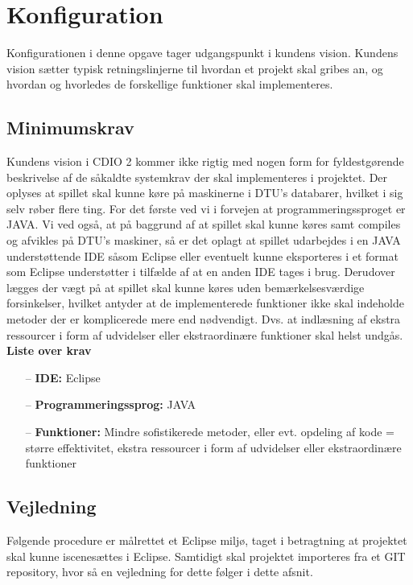 \chapter{Konfiguration}

Konfigurationen i denne opgave tager udgangspunkt i kundens vision. Kundens vision sætter typisk retningslinjerne til hvordan et projekt skal gribes an, og hvordan og hvorledes de forskellige funktioner skal implementeres.

\section{Minimumskrav}

Kundens vision i CDIO 2 kommer ikke rigtig med nogen form for fyldestgørende beskrivelse af de såkaldte systemkrav der skal implementeres i projektet. 
Der oplyses at spillet skal kunne køre på maskinerne i DTU’s databarer, hvilket i sig selv røber flere ting.
For det første ved vi i forvejen at programmeringssproget er JAVA. 
Vi ved også, at på baggrund af at spillet skal kunne køres samt compiles og afvikles på DTU's maskiner, så er det oplagt at spillet udarbejdes i en JAVA understøttende IDE såsom Eclipse eller eventuelt kunne eksporteres i et format som Eclipse understøtter i tilfælde af at en anden IDE tages i brug. 
Derudover lægges der vægt på at spillet skal kunne køres uden bemærkelsesværdige forsinkelser, hvilket antyder at de implementerede funktioner ikke skal indeholde metoder der er komplicerede mere end nødvendigt. 
Dvs. at indlæsning af ekstra ressourcer i form af udvidelser eller ekstraordinære funktioner skal helst undgås.
\\

\noindent \textbf{Liste over krav}
\begin{itemize}
    \item[--] \textbf{IDE:} Eclipse
    \item[--] \textbf{Programmeringssprog:} JAVA
    \item[--] \textbf{Funktioner:} Mindre sofistikerede metoder, eller evt. opdeling af kode = større effektivitet, ekstra ressourcer i form af udvidelser eller ekstraordinære funktioner
\end{itemize}

\section{Vejledning}

Følgende procedure er målrettet et Eclipse miljø, taget i betragtning at projektet skal kunne iscenesættes i Eclipse. Samtidigt skal projektet importeres fra et GIT repository, hvor så en vejledning for dette følger i dette afsnit.\\

